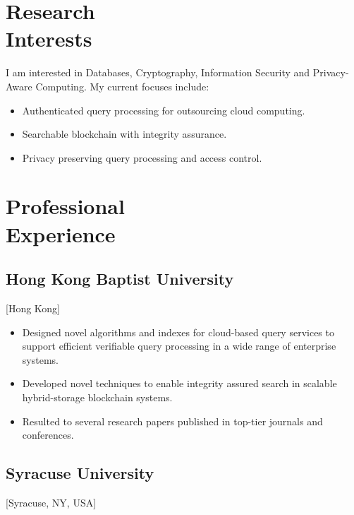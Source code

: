 \documentclass{mycv}
\begin{document}
\maketitle%

\section{Research \\ Interests}

I am interested in Databases, Cryptography, Information Security and Privacy-Aware Computing. My current focuses include:

\begin{itemize}
  \item Authenticated query processing for outsourcing cloud computing.
  \item Searchable blockchain with integrity assurance.
  \item Privacy preserving query processing and access control.
\end{itemize}

\section{Professional \\ Experience}

\subsection{Hong Kong Baptist University}[Hong Kong]
\begin{positions}
\end{positions}

\begin{itemize}
  \item Designed novel algorithms and indexes for cloud-based query services to support efficient verifiable query processing in a wide range of enterprise systems.
  \item Developed novel techniques to enable integrity assured search in scalable hybrid-storage blockchain systems.
  \item Resulted to several research papers published in top-tier journals and conferences.
\end{itemize}

\subsection{Syracuse University}[Syracuse, NY, USA]
\begin{positions}
\end{positions}
\end{document}
